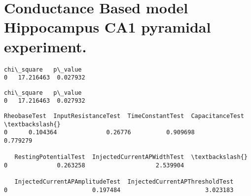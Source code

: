     \hypertarget{conductance-based-model-hippocampus-ca1-pyramidal-experiment.}{%
\section{Conductance Based model Hippocampus CA1 pyramidal
experiment.}\label{conductance-based-model-hippocampus-ca1-pyramidal-experiment.}}

            \begin{tcolorbox}[breakable, size=fbox, boxrule=.5pt, pad at break*=1mm, opacityfill=0]
\begin{Verbatim}[commandchars=\\\{\}]
   chi\_square   p\_value
0   17.216463  0.027932
\end{Verbatim}
\end{tcolorbox}
        
    

            \begin{tcolorbox}[breakable, size=fbox, boxrule=.5pt, pad at break*=1mm, opacityfill=0]
\begin{Verbatim}[commandchars=\\\{\}]
   chi\_square   p\_value
0   17.216463  0.027932
\end{Verbatim}
\end{tcolorbox}
        
            \begin{tcolorbox}[breakable, size=fbox, boxrule=.5pt, pad at break*=1mm, opacityfill=0]
\begin{Verbatim}[commandchars=\\\{\}]
   RheobaseTest  InputResistanceTest  TimeConstantTest  CapacitanceTest  \textbackslash{}
0      0.104364              0.26776          0.909698         0.779279

   RestingPotentialTest  InjectedCurrentAPWidthTest  \textbackslash{}
0              0.263258                    2.539904

   InjectedCurrentAPAmplitudeTest  InjectedCurrentAPThresholdTest
0                        0.197484                        3.023183
\end{Verbatim}
\end{tcolorbox}
        
